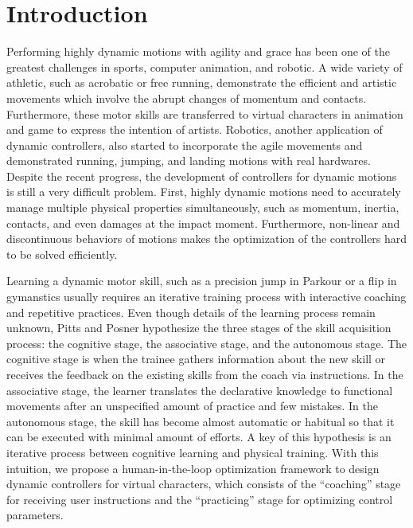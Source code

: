 \chapter{Introduction}

Performing highly dynamic motions with agility and grace has been
one of the greatest challenges in sports, computer animation, and robotic.
A wide variety of athletic, such as acrobatic or free running, demonstrate the
efficient and artistic movements which involve the abrupt changes of momentum
and contacts.
Furthermore, these motor skills are transferred to virtual characters 
in animation and game to express the intention of artists.
Robotics, another application of dynamic controllers, also started 
to incorporate the agile movements and demonstrated
running, jumping, and landing motions with real hardwares.
Despite the recent progress, the development of controllers 
for dynamic motions is still a very difficult problem.
First, highly dynamic motions need to accurately manage multiple
physical properties simultaneously, such as momentum, inertia, contacts, 
and even damages at the impact moment.
Furthermore, non-linear and discontinuous behaviors of motions
makes the optimization of the controllers hard to be solved efficiently.

Learning a dynamic motor skill, such as a precision jump in Parkour or
a flip in gymanstics usually requires an iterative training process
with interactive coaching and repetitive practices.
Even though details of the learning process remain unknown,
Pitts and Posner \cite{fitts:1967:hp} hypothesize the three stages
of the skill acquisition process: the cognitive stage, 
the associative stage, and the autonomous stage.
The cognitive stage is when the trainee gathers information about the new
skill or receives the feedback on the existing skills from the coach
via instructions.
In the associative stage, the learner translates the declarative knowledge
to functional movements after an unspecified amount of practice and few mistakes.
In the autonomous stage, the skill has become almost automatic or habitual 
so that it can be executed with minimal amount of efforts.
A key of this hypothesis is an iterative process between cognitive learning
and physical training.
With this intuition, we propose a human-in-the-loop optimization 
framework to design dynamic controllers for virtual characters,
which consists of the ``coaching'' stage for receiving user instructions 
and the ``practicing'' stage for optimizing control parameters.

